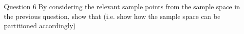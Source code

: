 
Question 6
By considering the relevant sample points from the sample space in the previous question, show that 
(i.e. show how the sample space can be partitioned accordingly)





